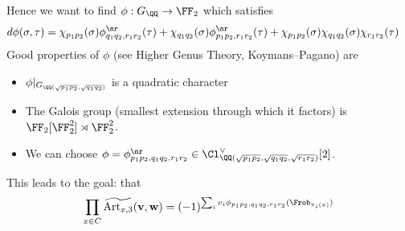 \documentclass{lecturenotes}
\newcommand{\Art}{\operatorname{Art}}
\newcommand{\bv}{\mathbf{v}}
\newcommand{\bw}{\mathbf{w}}
\numberwithin{equation}{section}
\begin{document}
Hence we want to find $\phi:G_\QQ\to \FF_2$ which satisfies
\begin{align*}
d\phi(\sigma,\tau)
&=\chi_{p_1p_2}(\sigma)\phi_{q_1q_2,r_1r_2}^\nr(\tau)
+\chi_{q_1q_2}(\sigma)\phi_{p_1p_2,r_1r_2}^\nr(\tau)
+\chi_{p_1p_2}(\sigma)\chi_{q_1q_2}(\sigma)\chi_{r_1r_2}(\tau)
\end{align*}
Good properties of $\phi$ (see Higher Genus Theory, Koymans--Pagano) are
\begin{itemize}
    \item $\phi|_{G_{\QQ(\sqrt{p_1p_2},\sqrt{q_1q_2})}}$ is a quadratic character
    \item The Galois group (smallest extension through which it factors) is $\FF_2[\FF_2^2]\rtimes \FF_2^2$.
    \item We can choose $\phi=\phi_{p_1p_2,q_1q_2,r_1r_2}^\nr\in \Cl_{\QQ(\sqrt{p_1p_2},\sqrt{q_1q_2},\sqrt{r_1r_2})}^\vee[2]$. 
\end{itemize}
This leads to the goal: that 
\[\prod_{x\in C}\widetilde{\Art_{x,3}}(\bv,\bw)=(-1)^{\sum_{i}v_i\phi_{p_1p_2,q_1q_2,r_1r_2}(\Frob_{\pi_i(x)})}\]

\lecture{}{}
\end{document}
